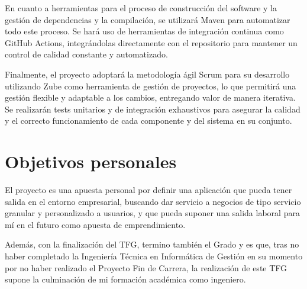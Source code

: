 En cuanto a herramientas para el proceso de construcción del software y la gestión de dependencias y la compilación, se utilizará Maven para automatizar todo este proceso. Se hará uso de herramientas de integración continua como GitHub Actions, integrándolas directamente con el repositorio para mantener un control de calidad constante y automatizado.

Finalmente, el proyecto adoptará la metodología ágil Scrum para su desarrollo utilizando Zube como herramienta de gestión de proyectos, lo que permitirá una gestión flexible y adaptable a los cambios, entregando valor de manera iterativa. Se realizarán tests unitarios y de integración exhaustivos para asegurar la calidad y el correcto funcionamiento de cada componente y del sistema en su conjunto.

\section{Objetivos personales}\label{objetivos-personales}
El proyecto es una apuesta personal por definir una aplicación que pueda tener salida en el entorno empresarial, buscando dar servicio a negocios de tipo servicio granular y personalizado a usuarios, y que pueda suponer una salida laboral para mí en el futuro como apuesta de emprendimiento.

Además, con la finalización del TFG, termino también el Grado y es que, tras no haber completado la Ingeniería Técnica en Informática de Gestión en su momento por no haber realizado el Proyecto Fin de Carrera, la realización de este TFG supone la culminación de mi formación académica como ingeniero.

